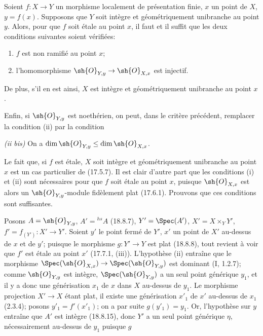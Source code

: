 \begin{theorem}[18.10.1]
\label{IV.18.10.1}
Soient $f:X\to Y$ un morphisme localement de présentation finie, $x$ un point de $X$, $y=f(x)$. Supposons que $Y$ soit intègre et géométriquement unibranche au point $y$. Alors, pour que $f$ soit étale au point $x$, il faut et il suffit que les deux conditions suivantes soient vérifiées:
\begin{enumerate}
  \item[(i)] $f$ est non ramifié au point $x$;
  \item[(ii)] l'homomorphisme $\sh{O}_{Y,y}\to\sh{O}_{X,x}$ est injectif.
\end{enumerate}
De plus, s'il en est ainsi, $X$ est intègre et géométriquement unibranche au point $x$.

Enfin, si $\sh{O}_{Y,y}$ est noethérien, on peut, dans le critère précédent, remplacer la condition (ii) par la condition

\emph{(ii bis)} On a $\dim\sh{O}_{Y,y}\leq\dim\sh{O}_{X,x}$.
\end{theorem}

Le fait que, si $f$ est étale, $X$ soit intègre et géométriquement unibranche au point $x$ est un cas particulier de (17.5.7). Il est clair d'autre part que les conditions (i) et (ii) sont nécessaires pour que $f$ soit étale au point $x$, puisque $\sh{O}_{X,x}$ est alors un $\sh{O}_{Y,y}$-module fidèlement plat (17.6.1). Prouvons que ces conditions sont suffisantes.

Posons $A=\sh{O}_{Y,y}$, $A'={}^{hs}\!A$ (18.8.7), $Y'=\Spec(A')$, $X'=X\times_Y Y'$, $f'=f_{(Y')}:X'\to Y'$. Soient $y'$ le point fermé de $Y'$, $x'$ un point de $X'$ au-dessus de $x$ et de $y'$; puisque le morphisme $g:Y'\to Y$ est plat (18.8.8), tout revient à voir que $f'$ est étale au point $x'$ (17.7.1, (iii)). L'hypothèse (ii) entraîne que le morphisme $\Spec(\sh{O}_{X,x})\to\Spec(\sh{O}_{Y,y})$ est dominant (I, 1.2.7); comme $\sh{O}_{Y,y}$ est intègre, $\Spec(\sh{O}_{Y,y})$ a un seul point générique $y_1$, et il y a donc une générisation $x_1$ de $x$ dans $X$ au-dessus de $y_1$. Le morphisme projection $X'\to X$ étant plat, il existe une générisation $x'_1$ de $x'$ au-dessus de $x_1$ (2.3.4); posons $y'_1=f'(x'_1)$; on a par suite $g(y'_1)=y_1$. Or, l'hypothèse sur $y$ entraîne que $A'$ est intègre (18.8.15), donc $Y'$ a un seul point générique $\eta$, nécessairement au-dessus de $y_1$ puisque $g$


